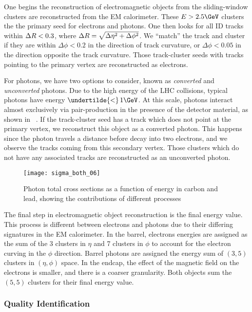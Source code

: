 One begins the reconstruction of electromagnetic objects from the sliding-window clusters are reconstructed from the EM calorimeter.
These $E > 2.5 \GeV$ clusters the the primary seed for electrons and photons.
One then looks for all ID tracks within $\Delta R < 0.3$, where $\Delta R = \sqrt{\Delta\eta^2 + \Delta\phi^2}$.
We ``match'' the track and cluster if they are within $\Delta \phi < 0.2$ in the direction of track curvature, or $\Delta \phi < 0.05$ in the direction opposite the track curvature.
Those track-cluster seeds with tracks pointing to the primary vertex are reconstructed as electrons.

For photons, we have two options to consider, known as \textit{converted} and \textit{unconverted} photons.
Due to the high energy of the LHC collisions, typical photons have energy $\undertilde{<} \, 1 \GeV$.
At this scale, photons interact almost exclusively via pair-production in the presence of the detector material, as shown in ~\cite{Agashe:2014kda}.
If the track-cluster seed has a track which does not point at the primary vertex, we reconstruct this object as a converted photon.
This happens since the photon travels a distance before decay into two electrons, and we observe the tracks coming from this secondary vertex.
Those clusters which do not have any associated tracks are reconstructed as an unconverted photon.
\begin{figure}
\caption{Photon total cross sections as a function of energy in carbon and lead, showing the contributions of different processes~\cite{Agashe:2014kda}} \label{fig:photon_pair_production}
\texttt{[image: sigma\_both\_06]}
\end{figure}

The final step in electromagnetic object reconstruction is the final energy value.
This process is different between electrons and photons due to their differing signatures in the EM calorimeter.
In the barrel, electrons energies are assigned as the sum of the 3 clusters in $\eta$ and 7 clusters in $\phi$ to account for the electron curving in the $\phi$ direction.
Barrel photons are assigned the energy sum of $(3,5)$ clusters in $(\eta, \phi)$ space.
In the endcap, the effect of the magnetic field on the electrons is smaller, and there is a coarser granularity.
Both objects sum the $(5,5)$ clusters for their final energy value.

\subsubsection{Quality Identification}

